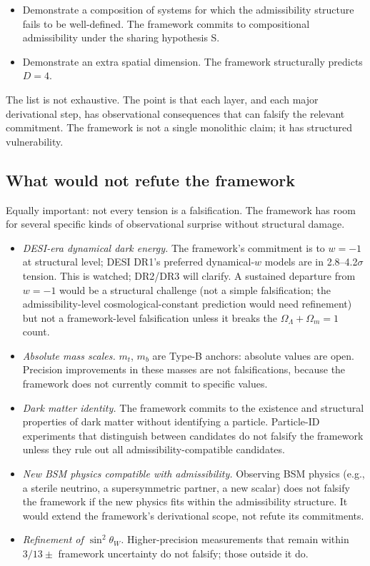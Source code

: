 \documentclass[11pt]{article}
\begin{document}
\begin{itemize}
    \item Demonstrate a composition of systems for which the admissibility structure fails to be well-defined. The framework commits to compositional admissibility under the sharing hypothesis S.
    \item Demonstrate an extra spatial dimension. The framework structurally predicts $D = 4$.
\end{itemize}

\noindent The list is not exhaustive. The point is that each layer, and each major derivational step, has observational consequences that can falsify the relevant commitment. The framework is not a single monolithic claim; it has structured vulnerability.

\subsection{What would not refute the framework}\label{sec:non_falsifiers}

Equally important: not every tension is a falsification. The framework has room for several specific kinds of observational surprise without structural damage.

\begin{itemize}
    \item \emph{DESI-era dynamical dark energy.} The framework's commitment is to $w = -1$ at structural level; DESI DR1's preferred dynamical-$w$ models are in 2.8--4.2$\sigma$ tension. This is watched; DR2/DR3 will clarify. A sustained departure from $w = -1$ would be a structural challenge (not a simple falsification; the admissibility-level cosmological-constant prediction would need refinement) but not a framework-level falsification unless it breaks the $\Omega_\Lambda + \Omega_m = 1$ count.
    \item \emph{Absolute mass scales.} $m_t$, $m_b$ are Type-B anchors: absolute values are open. Precision improvements in these masses are not falsifications, because the framework does not currently commit to specific values.
    \item \emph{Dark matter identity.} The framework commits to the existence and structural properties of dark matter without identifying a particle. Particle-ID experiments that distinguish between candidates do not falsify the framework unless they rule out all admissibility-compatible candidates.
    \item \emph{New BSM physics compatible with admissibility.} Observing BSM physics (e.g., a sterile neutrino, a supersymmetric partner, a new scalar) does not falsify the framework if the new physics fits within the admissibility structure. It would extend the framework's derivational scope, not refute its commitments.
    \item \emph{Refinement of $\sin^2\theta_W$.} Higher-precision measurements that remain within $3/13 \pm$ framework uncertainty do not falsify; those outside it do.
\end{itemize}
\end{document}
